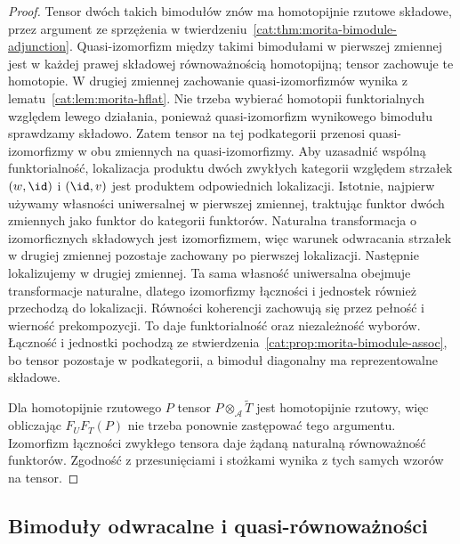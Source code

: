 \begin{proof}
Tensor dwóch takich bimodułów znów ma homotopijnie rzutowe składowe, przez argument ze sprzężenia w twierdzeniu~\ref{cat:thm:morita-bimodule-adjunction}. Quasi-izomorfizm między takimi bimodułami w pierwszej zmiennej jest w każdej prawej składowej równoważnością homotopijną; tensor zachowuje te homotopie. W drugiej zmiennej zachowanie quasi-izomorfizmów wynika z lematu~\ref{cat:lem:morita-hflat}. Nie trzeba wybierać homotopii funktorialnych względem lewego działania, ponieważ quasi-izomorfizm wynikowego bimodułu sprawdzamy składowo. Zatem tensor na tej podkategorii przenosi quasi-izomorfizmy w obu zmiennych na quasi-izomorfizmy. Aby uzasadnić wspólną funktorialność, lokalizacja produktu dwóch zwykłych kategorii względem strzałek $(w,\id)$ i $(\id,v)$ jest produktem odpowiednich lokalizacji. Istotnie, najpierw używamy własności uniwersalnej w pierwszej zmiennej, traktując funktor dwóch zmiennych jako funktor do kategorii funktorów. Naturalna transformacja o izomorficznych składowych jest izomorfizmem, więc warunek odwracania strzałek w drugiej zmiennej pozostaje zachowany po pierwszej lokalizacji. Następnie lokalizujemy w drugiej zmiennej. Ta sama własność uniwersalna obejmuje transformacje naturalne, dlatego izomorfizmy łączności i jednostek również przechodzą do lokalizacji. Równości koherencji zachowują się przez pełność i wierność prekompozycji. To daje funktorialność oraz niezależność wyborów. Łączność i jednostki pochodzą ze stwierdzenia~\ref{cat:prop:morita-bimodule-assoc}, bo tensor pozostaje w podkategorii, a bimoduł diagonalny ma reprezentowalne składowe.

Dla homotopijnie rzutowego $P$ tensor $P\otimes_{\mathcal A}\widetilde T$ jest homotopijnie rzutowy, więc obliczając $F_UF_T(P)$ nie trzeba ponownie zastępować tego argumentu. Izomorfizm łączności zwykłego tensora daje żądaną naturalną równoważność funktorów. Zgodność z przesunięciami i stożkami wynika z tych samych wzorów na tensor.
\end{proof}

\subsection{Bimoduły odwracalne i quasi-równoważności}

